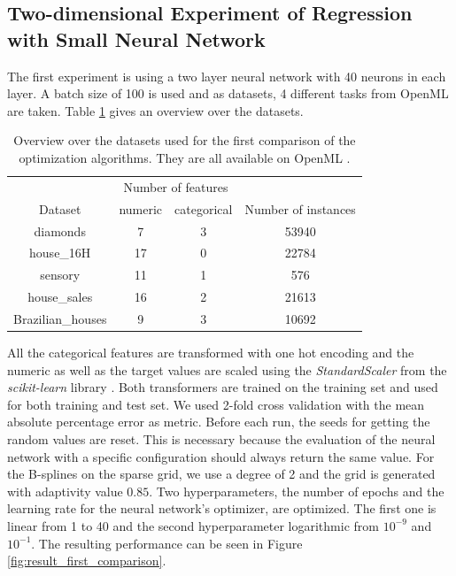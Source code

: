 \subsection{Two-dimensional Experiment of Regression with Small Neural Network}

The first experiment is using a two layer neural network with 40 neurons in each layer. A batch size of 100 is used and as datasets, 4 different tasks from OpenML are taken. Table \ref{tab:datasets_first_experiment} gives an overview over the datasets. 

\begin{table}[htbp!]
	\centering
	\caption{ Overview over the datasets used for the first comparison of the optimization algorithms. They are all available on OpenML \cite{OpenML2013}. }
	\label{tab:datasets_first_experiment}
	\begin{tabular}{| c | c | c | c |} 
		\hline
		 & \multicolumn{2}{c|}{Number of features} &   \\
		 Dataset& numeric & categorical & Number of instances  \\
		 \hline
		 diamonds & 7 & 3 & 53940  \\
		 house\_16H & 17 & 0 & 22784  \\
		 sensory & 11 & 1 & 576  \\
		 house\_sales & 16 & 2 & 21613  \\
		 Brazilian\_houses & 9 & 3 & 10692  \\
		\hline
	\end{tabular}
\end{table}

All the categorical features are transformed with one hot encoding and the numeric as well as the target values are scaled using the \textit{StandardScaler} from the \textit{scikit-learn} library \cite{scikit-learn}. Both transformers are trained on the training set and used for both training and test set. We used 2-fold cross validation with the mean absolute percentage error as metric. Before each run, the seeds for getting the random values are reset. This is necessary because the evaluation of the neural network with a specific configuration should always return the same value. For the B-splines on the sparse grid, we use a degree of 2 and the grid is generated with adaptivity value $ 0.85 $. Two hyperparameters, the number of epochs and the learning rate for the neural network's optimizer, are optimized. The first one is linear from 1 to 40 and the second hyperparameter logarithmic from $ 10^{-9} $ and $ 10^{-1} $. The resulting performance can be seen in Figure \ref{fig:result_first_comparison}.

